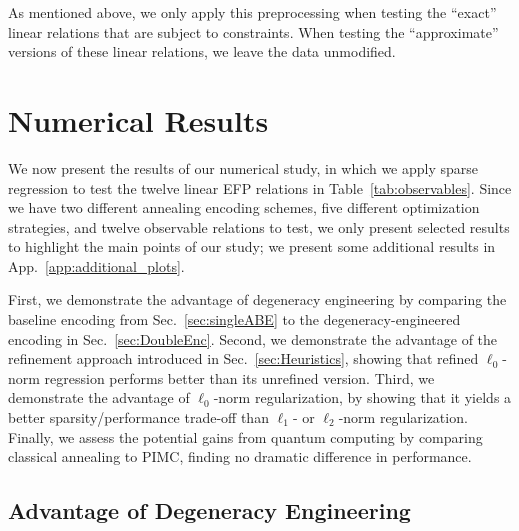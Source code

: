 \documentclass[aps,prd,twocolumn, superscriptaddress,preprintnumbers, nofootinbib,longbibliography,floatfix]{revtex4-2}
\DeclareRobustCommand{\Sec}[1]{Sec.~\ref{#1}}
\DeclareRobustCommand{\Tab}[1]{Table~\ref{#1}}
\begin{document}
As mentioned above, we only apply this preprocessing when testing the ``exact'' linear relations that are subject to constraints.
%
When testing the ``approximate'' versions of these linear relations, we leave the data unmodified.


\section{Numerical Results} \label{sec:NumResults}

We now present the results of our numerical study, in which we apply sparse regression to test the twelve linear EFP relations in \Tab{tab:observables}.
%
Since we have two different annealing encoding schemes, five different optimization strategies, and twelve observable relations to test, we only present selected results to highlight the main points of our study; we present some additional results in App.~\ref{app:additional_plots}.


First, we demonstrate the advantage of degeneracy engineering by comparing the baseline encoding from \Sec{sec:singleABE} to the degeneracy-engineered encoding in \Sec{sec:DoubleEnc}. 
%
Second, we demonstrate the advantage of the refinement approach introduced in \Sec{sec:Heuristics}, showing that refined $\ell_0$-norm regression performs better than its unrefined version.
%
Third, we demonstrate the advantage of $\ell_0$-norm regularization, by showing that it yields a better sparsity/performance trade-off than $\ell_1$- or $\ell_2$-norm regularization.
%
Finally, we assess the potential gains from quantum computing by comparing classical annealing to PIMC, finding no dramatic difference in performance. 



\subsection{Advantage of Degeneracy Engineering}
\label{sec:ResultsDegEng}
\end{document}
